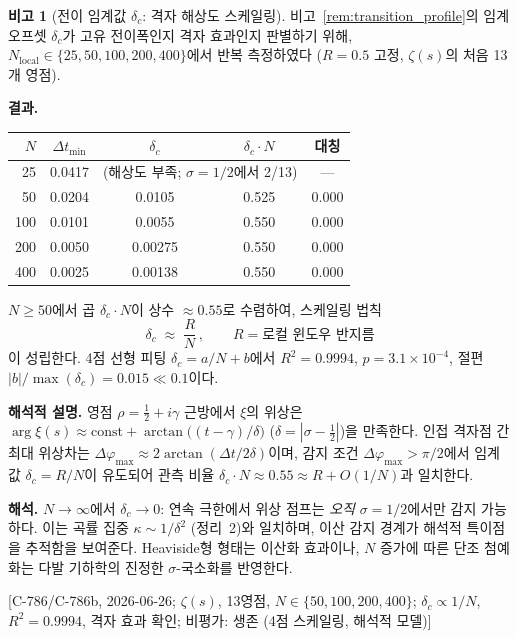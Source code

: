 \documentclass[11pt, a4paper]{article}
\theoremstyle{definition}
\newtheorem{remark}{비고}[section]
\theoremstyle{plain}
\newcommand{\xif}{\xi}
\begin{document}
\begin{remark}[전이 임계값 $\delta_c$: 격자 해상도 스케일링]
\label{rem:transition_N_dependence}
비고~\ref{rem:transition_profile}의 임계 오프셋 $\delta_c$가
고유 전이폭인지 격자 효과인지 판별하기 위해,
$N_{\mathrm{local}} \in \{25, 50, 100, 200, 400\}$에서
반복 측정하였다 ($R = 0.5$ 고정, $\zeta(s)$의 처음 13개 영점).

\smallskip\noindent
\textbf{결과.}\;
\begin{center}
\begin{tabular}{rcccc}
\toprule
$N$ & $\Delta t_{\min}$ & $\delta_c$ & $\delta_c \cdot N$
    & 대칭 \\
\midrule
25  & 0.0417 & \multicolumn{2}{c}{(해상도 부족; $\sigma{=}1/2$에서 2/13)}
    & --- \\
50  & 0.0204 & 0.0105 & 0.525 & 0.000 \\
100 & 0.0101 & 0.0055 & 0.550 & 0.000 \\
200 & 0.0050 & 0.00275 & 0.550 & 0.000 \\
400 & 0.0025 & 0.00138 & 0.550 & 0.000 \\
\bottomrule
\end{tabular}
\end{center}

$N \ge 50$에서 곱 $\delta_c \cdot N$이 상수 $\approx 0.55$로 수렴하여,
스케일링 법칙
\begin{equation}
  \delta_c \;\approx\; \frac{R}{N}\,,
  \qquad R = \text{로컬 윈도우 반지름}
  \label{eq:delta_c_scaling}
\end{equation}
이 성립한다.
4점 선형 피팅 $\delta_c = a/N + b$에서
$R^2 = 0.9994$, $p = 3.1 \times 10^{-4}$,
절편 $|b|/\max(\delta_c) = 0.015 \ll 0.1$이다.

\smallskip\noindent
\textbf{해석적 설명.}\;
영점 $\rho = \tfrac12 + i\gamma$ 근방에서 $\xif$의 위상은
$\arg\xif(s) \approx \mathrm{const} + \arctan\!\bigl((t-\gamma)/\delta\bigr)$
($\delta = |\sigma - \tfrac12|$)을 만족한다.
인접 격자점 간 최대 위상차는
$\Delta\varphi_{\max} \approx 2\arctan(\Delta t / 2\delta)$이며,
감지 조건 $\Delta\varphi_{\max} > \pi/2$에서
임계값 $\delta_c = R/N$이 유도되어
관측 비율 $\delta_c \cdot N \approx 0.55 \approx R{+}O(1/N)$과 일치한다.

\smallskip\noindent
\textbf{해석.}\;
$N \to \infty$에서 $\delta_c \to 0$:
연속 극한에서 위상 점프는 \emph{오직} $\sigma = 1/2$에서만 감지 가능하다.
이는 곡률 집중 $\kappa \sim 1/\delta^2$ (정리~2)와 일치하며,
이산 감지 경계가 해석적 특이점을 추적함을 보여준다.
Heaviside형 형태는 이산화 효과이나,
$N$ 증가에 따른 단조 첨예화는
다발 기하학의 진정한 $\sigma$-국소화를 반영한다.

[C-786/C-786b, 2026-06-26; $\zeta(s)$, 13영점,
$N \in \{50,100,200,400\}$;
$\delta_c \propto 1/N$, $R^2{=}0.9994$, 격자 효과 확인;
비평가: 생존 (4점 스케일링, 해석적 모델)]
\end{remark}
\end{document}
